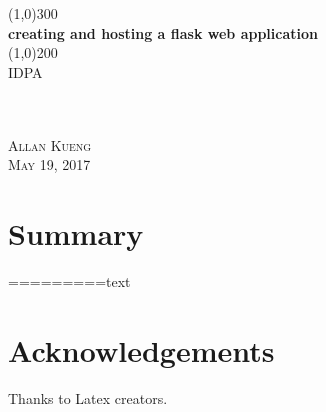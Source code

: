 \documentclass{article}
\begin{document}
\begin{titlepage}
    \begin{center}
    \line(1,0){300} \\ %
    [3mm]%
    \huge{\bfseries creating and hosting a flask web application} \\
    [2mm]%
    \line(1,0){200} \\ %
    [1.5cm]%
    \textsc{\LARGE IDPA} \\
    [0.75cm]
     \\
    \\
    [9cm]
    \end{center}
    \begin{flushright}
    \textsc{\large Allan Kueng\\
    May 19, 2017 \\}
    \end{flushright}
\end{titlepage}


\section*{Summary}
=========text
\cleardoublepage



\section*{Acknowledgements}
Thanks to Latex creators.
\end{document}
